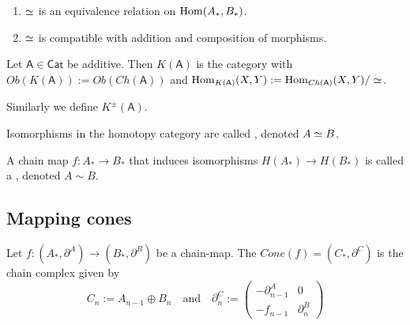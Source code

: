 \documentclass[fontsize=11pt,fleqn,a4paper]{scrartcl}
\begin{document}
\begin{lemma}
\begin{enumerate}
\item $\simeq$ is an equivalence relation on $\operatorname{Hom}(A_\ast,B_\ast)$.
\item $\simeq$ is compatible with addition and composition of morphisms.
\end{enumerate}
\end{lemma}

\begin{definition}
Let $\mathsf{A}\in\mathsf{Cat}$ be additive. Then $K(\mathsf{A})$ is the category with $Ob(K(\mathsf{A})) := Ob(Ch(\mathsf{A}))$ and $\operatorname{Hom}_{K(\mathsf{A})}(X,Y) := \operatorname{Hom}_{Ch(\mathsf{A})}(X,Y) / \simeq$.

Similarly we define $K^\pm(\mathsf{A})$.
\end{definition}

\begin{definition}
Isomorphisms in the homotopy category are called , denoted $A\simeq B$.

A chain map $f: A_\ast\to B_\ast$ that induces isomorphisms $H(A_\ast) \to H(B_\ast)$ is called a , denoted $A \sim B$.
\end{definition}

\subsection{Mapping cones}

\begin{definition}
Let $f:(A_\ast,\partial^A)\to(B_\ast,\partial^B)$ be a chain-map. The  $Cone(f)=(C_\ast,\partial^{C})$ is the chain complex given by
\[C_n := A_{n-1} \oplus B_n \quad\text{and}\quad \partial_n^{C} := \begin{pmatrix}-\partial_{n-1}^A & 0 \\ -f_{n-1} & \partial_n^B \end{pmatrix}\]
\end{definition}
\end{document}
